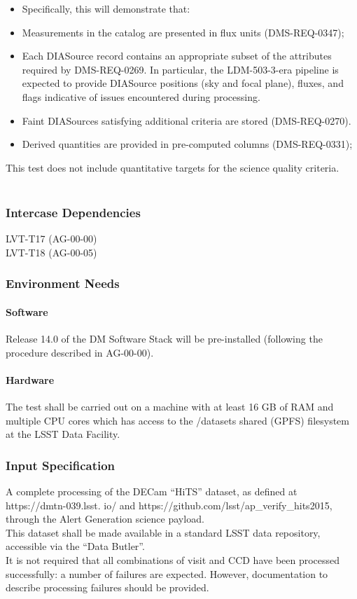 \begin{itemize}
\tightlist
\item
  Specifically, this will demonstrate that:
\item
  Measurements in the catalog are presented in flux units
  (DMS-REQ-0347);
\item
  Each DIASource record contains an appropriate subset of the attributes
  required by DMS-REQ-0269. In particular, the LDM-503-3-era pipeline is
  expected to provide DIASource positions (sky and focal plane), fluxes,
  and flags indicative of issues encountered during processing.
\item
  Faint DIASources satisfying additional criteria are stored
  (DMS-REQ-0270).
\item
  Derived quantities are provided in pre-computed columns
  (DMS-REQ-0331);
\end{itemize}

This test does not include quantitative targets for the science quality
criteria.\\
~\\



\subsubsection{Intercase Dependencies}
LVT-T17 (AG-00-00)\\
LVT-T18 (AG-00-05)


\subsubsection{Environment Needs}

\paragraph{Software}
Release 14.0 of the DM Software Stack will be pre-installed (following
the procedure described in AG-00-00).


\paragraph{Hardware}
The test shall be carried out on a machine with at least 16 GB of RAM
and multiple CPU cores which has access to the /datasets shared (GPFS)
filesystem at the LSST Data Facility.


\subsubsection{Input Specification}
A complete processing of the DECam ``HiTS'' dataset, as defined at
https://dmtn-039.lsst. io/ and
https://github.com/lsst/ap\_verify\_hits2015, through the Alert
Generation science payload.\\
This dataset shall be made available in a standard LSST data repository,
accessible via the ``Data Butler''.\\
It is not required that all combinations of visit and CCD have been
processed successfully: a number of failures are expected. However,
documentation to describe processing failures should be provided.


